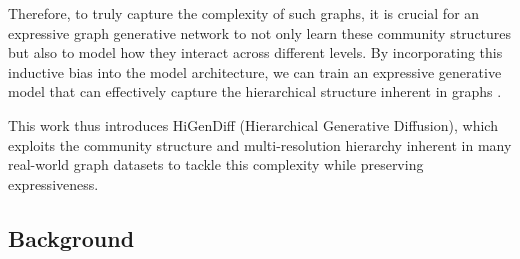 Therefore, to truly capture the complexity of such graphs, it is crucial for an expressive graph generative network to not only learn these community structures but also to model how they interact across different levels. By incorporating this inductive bias into the model architecture, we can train an expressive generative model that can effectively capture the hierarchical structure inherent in graphs \cite{karami_multi-resolution_2024}. 

This work thus introduces HiGenDiff (Hierarchical Generative Diffusion), which exploits the community structure and multi-resolution hierarchy inherent in many real-world graph datasets to tackle this complexity while preserving expressiveness.

\subsection{Background}

